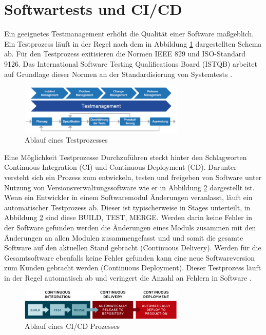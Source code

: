 \section{Softwartests und CI/CD} \label{sec:CICD}

Ein geeignetes Testmanagement erhöht die Qualität einer Software maßgeblich. Ein Testprozess läuft in der Regel nach dem in Abbildung \ref{fig:testprozess} dargestellten Schema ab. Für den Testprozess exitisieren die Normen IEEE 829 und ISO-Standard 9126. Das International Software Testing Qualifications Board (ISTQB) arbeitet auf Grundlage dieser Normen an der Standardisierung von Systemtests \cite{witte2019testmanagement}.
\begin{figure}
    \centering
    \includegraphics[width=0.7\textwidth]{figures/2_Grundlagen/testprozess.png}
    \caption{Ablauf eines Testprozesses \cite{witte2019testmanagement}}
    \label{fig:testprozess}
\end{figure}

Eine Möglichkeit Testprozesse Durchzuführen steckt hinter den Schlagworten Continuous Integration (CI) und Continuous Deployment (CD). Darunter versteht sich ein Prozess zum entwickeln, testen und freigeben von Software unter Nutzung von Versionsverwaltungssoftware wie er in Abbildung \ref{fig:ci-cd-flow-desktop} dargestellt ist. Wenn ein Entwickler in einem Softwaremodul Änderungen veranlasst, läuft ein automatischer Testprozess ab. Dieser ist typischerweise in Stages unterteilt, in Abbildung \ref{fig:ci-cd-flow-desktop} sind diese BUILD, TEST, MERGE. Werden darin keine Fehler in der Software gefunden werden die Änderungen eines Moduls zusammen mit den Änderungen an allen Modulen zusammengefasst und und somit die gesamte Software auf den aktuellen Stand gebracht (Continuous Delivery). Werden für die Gesamtsoftware ebenfalls keine Fehler gefunden kann eine neue Softwareversion zum Kunden gebracht werden (Continuous Deployment). Dieser Testprozess läuft in der Regel automatisch ab und veringert die Anzahl an Fehlern in Software \cite{redhat2024}.
\begin{figure}
    \centering
    \includegraphics[width=0.7\textwidth]{figures/2_Grundlagen/ci-cd-flow-desktop.png}
    \caption{Ablauf eines CI/CD Prozesses \cite{redhat2024}}
    \label{fig:ci-cd-flow-desktop}
\end{figure}